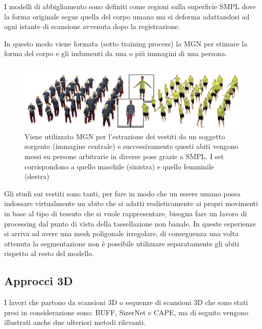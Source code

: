\medskip

I modelli di abbigliamento sono definiti come regioni sulla superficie SMPL dove la forma originale segue quella del corpo umano ma si deforma adattandosi ad ogni istante di scansione avvenuta dopo la registrazione.

\medskip

In questo modo viene formata (sotto training process) la MGN per stimare la forma del corpo e gli indumenti da una o più immagini di una persona.

\medskip

\begin{figure}[ht!]
  \centering
  \includegraphics[scale=0.5]{Images/SizerPic/Sizer5.png}
  \caption{Viene utilizzato MGN per l'estrazione dei vestiti da un soggetto sorgente (immagine centrale) e successivamente questi abiti vengono messi su persone arbitrarie in diverse pose grazie a SMPL. I set corrispondono a quello maschile (sinistra) e quello femminile (destra)}
    \label{fig:Sizer5}
\end{figure}

\medskip\medskip\medskip\medskip\medskip\medskip\medskip\medskip\medskip


Gli studi sui vestiti sono tanti, per fare in modo che un essere umano possa indossare virtualmente un abito che si adatti realisticamente ai propri movimenti in base al tipo di tessuto che si vuole rappresentare, bisogna fare un lavoro di processing dal punto di vista della tassellazione non banale.
In queste esperienze si arriva ad avere una mesh poligonale irregolare, di conseguenza una volta ottenuta la segmentazione non è possibile utilizzare separatamente gli abiti rispetto al resto del modello.

\newpage

\subsection{Approcci 3D}

I lavori che partono da scansioni 3D o sequenze di scansioni 3D che sono stati presi in considerazione sono: BUFF, SizerNet e CAPE, ma di seguito vengono illustrati anche due ulteriori metodi rilevanti.

